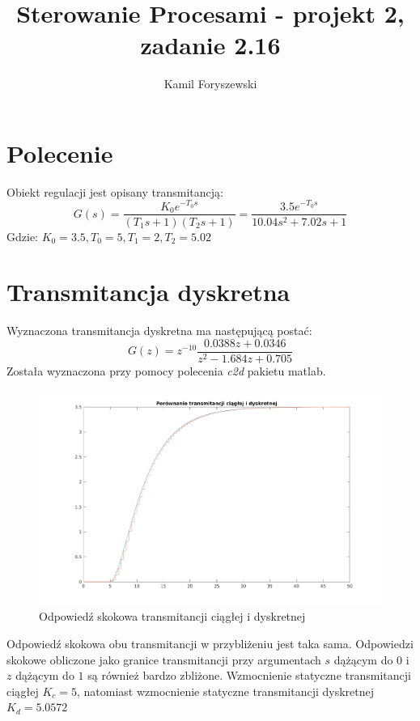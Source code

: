 \documentclass[a4paper, 11pt]{article}
\author{Kamil Foryszewski}
\title{Sterowanie Procesami - projekt 2, zadanie 2.16}
\begin{document}

\maketitle
\tableofcontents

\section{Polecenie}
Obiekt regulacji jest opisany transmitancją: 
$$G(s) = \frac{K_0e^{-T_0s}}{(T_1s + 1)(T_2s+1)}  = \frac{3.5e^{-T_0s}}{10.04s^2+7.02s +1}  $$
Gdzie: 
$K_0 = 3.5, T_0 = 5, T_1 = 2, T_2 = 5.02$

\section{Transmitancja dyskretna}
Wyznaczona transmitancja dyskretna ma następującą postać: 
$$G(z) = z^{-10}\frac{0.0388z+0.0346}{z^2-1.684z+0.705}$$
Została wyznaczona przy pomocy polecenia \emph{c2d} pakietu matlab. 
\begin{figure}[H]
\centering
\includegraphics[scale=0.6]{1_1.png}
\caption{Odpowiedź skokowa transmitancji ciągłej i dyskretnej}
\label{step:1}
\end{figure}
Odpowiedź skokowa obu transmitancji w przybliżeniu jest taka sama. Odpowiedzi skokowe obliczone jako granice transmitancji przy argumentach $s$ dążącym do $0$ i $z$ dążącym do $1$ są również bardzo zbliżone. Wzmocnienie statyczne transmitancji ciągłej $K_c = 5$, natomiast wzmocnienie statyczne transmitancji dyskretnej $K_d = 5.0572$
\end{document}
